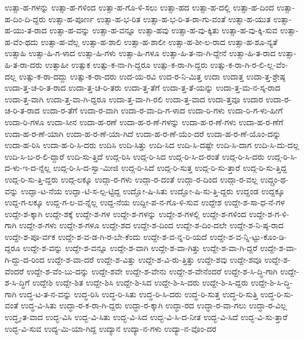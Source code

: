 {ಉತ್ಸಾ-ಹ-ಗಳನ್ನು
ಉತ್ಸಾ-ಹ-ಗಳಿಂದ
ಉತ್ಸಾ-ಹ-ಗೊ-ಳಿ-ಸಲು
ಉತ್ಸಾ-ಹದ
ಉತ್ಸಾ-ಹ-ದಲ್ಲಿ
ಉತ್ಸಾ-ಹ-ದಿಂದ
ಉತ್ಸಾ-ಹ-ದಿಂ-ದಿ-ದ್ದರು
ಉತ್ಸಾ-ಹ-ಪೂರ್ಣ
ಉತ್ಸಾ-ಹ-ಭ-ರಿತ
ಉತ್ಸಾ-ಹ-ಭ-ರಿ-ತ-ರಾ-ಗು-ವಂತೆ
ಉತ್ಸಾ-ಹ-ಯುತ
ಉತ್ಸಾ-ಹ-ಯು-ತ-ರಾದ
ಉತ್ಸಾ-ಹ-ವನ್ನು
ಉತ್ಸಾ-ಹ-ವನ್ನೂ
ಉತ್ಸಾ-ಹವು
ಉತ್ಸಾ-ಹ-ವು-ಕ್ಕಿತು
ಉತ್ಸಾ-ಹ-ವು-ಕ್ಕಿ-ಸುವ
ಉತ್ಸಾ-ಹ-ವೆಂ-ಥದು
ಉತ್ಸಾ-ಹ-ವೆಲ್ಲ
ಉತ್ಸಾ-ಹ-ಶಾಲಿ
ಉತ್ಸಾ-ಹ-ಶಾಲೀ
ಉತ್ಸಾ-ಹ-ಶೀ-ಲ-ರಾದ
ಉತ್ಸಾ-ಹ-ಶೂ-ನ್ಯತೆ
ಉತ್ಸಾಹಿ
ಉತ್ಸಾ-ಹಿ-ಗ-ಳಾದ
ಉತ್ಸಾ-ಹಿ-ಗಳು
ಉತ್ಸಾ-ಹಿ-ಗಳೂ
ಉತ್ಸಾ-ಹಿ-ತ-ನಾ-ಗಿ-ದ್ದೇನೆ
ಉತ್ಸಾ-ಹಿ-ತ-ರಾದ
ಉತ್ಸಾ-ಹಿ-ತ-ರಾ-ದರು
ಉತ್ಸಾಹೀ
ಉತ್ಸುಕ
ಉತ್ಸು-ಕ-ನಾ-ಗಿ-ದ್ದರೂ
ಉತ್ಸು-ಕ-ರಾ-ಗಿ-ದ್ದರು
ಉತ್ಸು-ಕ-ರಾ-ಗಿ-ರ-ಲಿ-ಲ್ಲ-ವೆಂ-ದಲ್ಲ
ಉತ್ಸು-ಕ-ರಾ-ದದ್ದು
ಉತ್ಸು-ಕ-ರಾ-ದರು
ಉದ-ಯ-ರವಿ
ಉದ-ರ-ನಿ-ಮಿತ್ತ
ಉದಾ
ಉದಾತ್ತ
ಉದಾ-ತ್ತ-ಶ್ರೇಷ್ಠ
ಉದಾ-ತ್ತ-ಚ-ರಿ-ತ-ರಾದ
ಉದಾ-ತ್ತ-ಚ-ರಿ-ತರು
ಉದಾ-ತ್ತ-ತೆಗೆ
ಉದಾ-ತ್ತ-ತೆ-ಯನ್ನು
ಉದಾ-ತ್ತ-ಮ-ನ-ಸ್ಕ-ರಾದ
ಉದಾ-ತ್ತ-ವಾಗಿ
ಉದಾ-ತ್ತ-ವಾ-ಗಿ-ದ್ದರೂ
ಉದಾ-ತ್ತ-ವಾ-ಗಿ-ರಲಿ
ಉದಾ-ತ್ತ-ವಾದ
ಉದಾ-ತ್ತವೂ
ಉದಾರ
ಉದಾ-ರ-ಚ-ರಿ-ತ-ರಾದ
ಉದಾ-ರ-ತೆಗೆ
ಉದಾ-ರ-ವಾಗಿ
ಉದಾ-ರ-ವಾ-ದಿ-ಗ-ಳಾದ
ಉದಾ-ರಿ-ಗಳು
ಉದಾ-ರಿ-ಗ-ಳು-ಹೀಗೆ
ಉದಾ-ರಿ-ಗಳೂ
ಉದಾ-ಸೀನ
ಉದಾ-ಹ-ರಣೆ
ಉದಾ-ಹ-ರ-ಣೆ-ಗಳನ್ನು
ಉದಾ-ಹ-ರ-ಣೆ-ಗಳು
ಉದಾ-ಹ-ರ-ಣೆಗೆ
ಉದಾ-ಹ-ರ-ಣೆ-ಯಾಗಿ
ಉದಾ-ಹ-ರ-ಣೆ-ಯಾ-ಗಿದೆ
ಉದಾ-ಹ-ರ-ಣೆ-ಯೆಂ-ದರೆ
ಉದಾ-ಹ-ರ-ಣೆ-ಯೊಂ-ದನ್ನು
ಉದಾ-ಹ-ರಿಸಿ
ಉದಾ-ಹ-ರಿ-ಸಿ-ದರು
ಉದಿಸಿ
ಉದಿ-ಸಿತ್ತು
ಉದಿ-ಸಿದ
ಉದಿ-ಸಿ-ದಷ್ಟೇ
ಉದಿ-ಸಿ-ದಾಗ
ಉದಿ-ಸಿ-ದು-ದಲ್ಲ
ಉದಿ-ಸಿ-ಬ-ರ-ಲಿ-ದ್ದಾರೆ
ಉದಿ-ಸು-ತ್ತಿದೆ
ಉದ್ಗ-ರಿಸಿ
ಉದ್ಗ-ರಿ-ಸಿದ
ಉದ್ಗ-ರಿ-ಸಿ-ದ-ರಂತೆ
ಉದ್ಗ-ರಿ-ಸಿ-ದರು
ಉದ್ಗ-ರಿ-ಸಿ-ದ-ಳು-ಇ-ದ-ನ್ನೆಲ್ಲ
ಉದ್ಗ-ರಿ-ಸಿ-ದ-ಸ್ವಾ-ಮೀಜಿ
ಉದ್ಗ-ರಿ-ಸಿದೆ
ಉದ್ಗ-ರಿ-ಸುತ್ತ
ಉದ್ಗ-ರಿ-ಸು-ತ್ತಾರೆ
ಉದ್ಗ-ರಿ-ಸು-ತ್ತಿದ್ದ
ಉದ್ಗ-ರಿ-ಸು-ತ್ತಿ-ದ್ದರು
ಉದ್ಗ-ಲಕ್ಕೂ
ಉದ್ಗಾ-ರ-ಗಳು
ಉದ್ಗಾ-ರ-ದಂತೆ
ಉದ್ಗಾ-ರ-ದಿಂದ
ಉದ್ಗಾ-ರ-ವಲ್ಲ
ಉದ್ಗ್ರಂ-ಥ-ವನ್ನು
ಉದ್ಘಾ-ಟ-ನೆಯ
ಉದ್ಘಾ-ಟಿ-ಸ-ಲ್ಪ-ಟ್ಟಿದ್ದ
ಉದ್ಘೋ-ಷಿ-ಸಿತು
ಉದ್ಘೋ-ಷಿ-ಸು-ತ್ತಿ-ದ್ದರು
ಉದ್ದಂಡ
ಉದ್ದಕ್ಕೂ
ಉದ್ದ-ಗ-ಲಕ್ಕೂ
ಉದ್ದ-ಗ-ಲ-ವ-ನ್ನೆಲ್ಲ
ಉದ್ದ-ನೆಯ
ಉದ್ದೀ-ಪ-ನ-ಗೊ-ಳಿ-ಸುವ
ಉದ್ದೇಶ
ಉದ್ದೇ-ಶ-ಸಾ-ಧ-ನೆ-ಗಳ
ಉದ್ದೇ-ಶ-ಕ್ಕಾಗಿ
ಉದ್ದೇ-ಶಕ್ಕೆ
ಉದ್ದೇ-ಶ-ಗಳ
ಉದ್ದೇ-ಶ-ಗಳನ್ನು
ಉದ್ದೇ-ಶ-ಗಳಲ್ಲಿ
ಉದ್ದೇ-ಶ-ಗಳಿಂದ
ಉದ್ದೇ-ಶ-ಗ-ಳಿ-ಗಾಗಿ
ಉದ್ದೇ-ಶ-ಗಳು
ಉದ್ದೇ-ಶ-ಗಳೂ
ಉದ್ದೇ-ಶದ
ಉದ್ದೇ-ಶ-ದಿಂದ
ಉದ್ದೇ-ಶ-ದಿಂ-ದಲೇ
ಉದ್ದೇ-ಶ-ನಿ-ಷ್ಠ-ರಾದ
ಉದ್ದೇ-ಶ-ಪೂ-ರ್ವಕ
ಉದ್ದೇ-ಶ-ವ-ಡ-ಗಿ-ರ-ಬೇ-ಕೆಂದು
ಉದ್ದೇ-ಶ-ವ-ನ್ನ-ರಿ-ಯದೆ
ಉದ್ದೇ-ಶ-ವ-ನ್ನಿ-ಟ್ಟು-ಕೊಂ-ಡಿ-ದ್ದರೂ
ಉದ್ದೇ-ಶ-ವನ್ನು
ಉದ್ದೇ-ಶ-ವನ್ನೂ
ಉದ್ದೇ-ಶ-ವಾಗಿ
ಉದ್ದೇ-ಶ-ವಾ-ಗಿತ್ತು
ಉದ್ದೇ-ಶ-ವಾ-ಗಿ-ದ್ದರೆ
ಉದ್ದೇ-ಶ-ವಾ-ಗಿ-ದ್ದು-ದ-ರಿಂದ
ಉದ್ದೇ-ಶ-ವಾ-ದರೆ
ಉದ್ದೇ-ಶ-ವಿತ್ತು
ಉದ್ದೇ-ಶ-ವಿ-ರು-ತ್ತಿತ್ತು
ಉದ್ದೇ-ಶವು
ಉದ್ದೇ-ಶವೂ
ಉದ್ದೇ-ಶ-ವೆಂದರೆ
ಉದ್ದೇ-ಶ-ವೆಂ-ಬು-ದನ್ನು
ಉದ್ದೇ-ಶವೇ
ಉದ್ದೇ-ಶ-ವೇನು
ಉದ್ದೇ-ಶ-ವೇನೆಂದರೆ
ಉದ್ದೇ-ಶ-ಸಿ-ದ್ಧಿ-ಗಾಗಿ
ಉದ್ದೇ-ಶ-ಸಿ-ದ್ಧಿಗೆ
ಉದ್ದೇಶಿ
ಉದ್ದೇ-ಶಿತ
ಉದ್ದೇ-ಶಿಸಿ
ಉದ್ದೇ-ಶಿ-ಸಿದ
ಉದ್ದೇ-ಶಿ-ಸಿ-ದರು
ಉದ್ದೇ-ಶಿ-ಸಿ-ದ್ದರು
ಉದ್ದೇ-ಶಿ-ಸಿ-ದ್ಧಿ-ಗಾಗಿ
ಉದ್ಧ-ಟ-ತ-ನ-ವನ್ನು
ಉದ್ಧ-ರಿಸಿ
ಉದ್ಧ-ರಿ-ಸಿತು
ಉದ್ಧ-ರಿ-ಸಿ-ದರು
ಉದ್ಧ-ರಿ-ಸುತ್ತ
ಉದ್ಧ-ರಿ-ಸುತ್ತಿ
ಉದ್ಧ-ರಿ-ಸು-ವಂತೆ
ಉದ್ಧ-ವಿ-ಸಿತು
ಉದ್ಧಾ-ರ-ಕ-ರಾ-ಗಿ-ದ್ದರು
ಉದ್ಧಾ-ರ-ಕ್ಕಾಗಿ
ಉದ್ಧಾ-ರದ
ಉದ್ಧಾ-ರ-ವಾ-ಗಲು
ಉದ್ಧಾ-ರ-ವಿಲ್ಲ
ಉದ್ಧೃ-ತ-ವಾದ
ಉದ್ಭ-ವಿಸಿ
ಉದ್ಭ-ವಿ-ಸಿತು
ಉದ್ಭ-ವಿ-ಸಿದ
ಉದ್ಭ-ವಿ-ಸಿ-ದ-ನೀತ
ಉದ್ಭ-ವಿ-ಸಿದೆ
ಉದ್ಭ-ವಿ-ಸು-ತ್ತಾರೆ
ಉದ್ಭ-ವಿ-ಸುವ
ಉದ್ಯ-ಮಿ-ಯಾ-ಗಿದ್ದ
ಉದ್ಯಾನ
ಉದ್ಯಾ-ನ-ಗಳು
ಉದ್ಯಾ-ನ-ವೊಂ-ದರ
}
